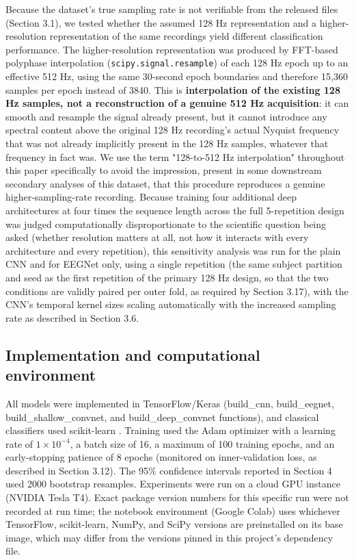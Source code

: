 \documentclass[a4paper,fleqn]{cas-sc}
\begin{document}
Because the dataset's true sampling rate is not verifiable from the released files (Section 3.1), we tested whether the assumed 128 Hz representation and a higher-resolution representation of the same recordings yield different classification performance. The higher-resolution representation was produced by FFT-based polyphase interpolation (\texttt{scipy.signal.resample}) of each 128 Hz epoch up to an effective 512 Hz, using the same 30-second epoch boundaries and therefore 15,360 samples per epoch instead of 3840. This is \textbf{interpolation of the existing 128 Hz samples, not a reconstruction of a genuine 512 Hz acquisition}: it can smooth and resample the signal already present, but it cannot introduce any spectral content above the original 128 Hz recording's actual Nyquist frequency that was not already implicitly present in the 128 Hz samples, whatever that frequency in fact was. We use the term "128-to-512 Hz interpolation" throughout this paper specifically to avoid the impression, present in some downstream secondary analyses of this dataset, that this procedure reproduces a genuine higher-sampling-rate recording. Because training four additional deep architectures at four times the sequence length across the full 5-repetition design was judged computationally disproportionate to the scientific question being asked (whether resolution matters at all, not how it interacts with every architecture and every repetition), this sensitivity analysis was run for the plain CNN and for EEGNet only, using a single repetition (the same subject partition and seed as the first repetition of the primary 128 Hz design, so that the two conditions are validly paired per outer fold, as required by Section 3.17), with the CNN's temporal kernel sizes scaling automatically with the increased sampling rate as described in Section 3.6.



\subsection{Implementation and computational environment}

All models were implemented in TensorFlow/Keras \cite{abadi2016tensorflow} (build\_cnn, build\_eegnet, build\_shallow\_convnet, and build\_deep\_convnet functions), and classical classifiers used scikit-learn \cite{pedregosa2011scikitlearn}. Training used the Adam optimizer \cite{kingma2015adam} with a learning rate of $1\times10^{-4}$, a batch size of 16, a maximum of 100 training epochs, and an early-stopping patience of 8 epochs (monitored on inner-validation loss, as described in Section 3.12). The 95\% confidence intervals reported in Section 4 used 2000 bootstrap resamples. Experiments were run on a cloud GPU instance (NVIDIA Tesla T4). Exact package version numbers for this specific run were not recorded at run time; the notebook environment (Google Colab) uses whichever TensorFlow, scikit-learn, NumPy, and SciPy versions are preinstalled on its base image, which may differ from the versions pinned in this project's dependency file.
\end{document}
